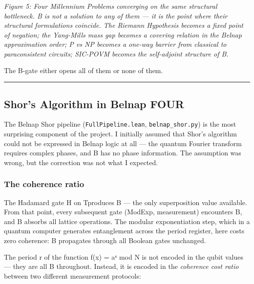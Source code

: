 \documentclass[12pt,a4paper]{article}
\begin{document}
\emph{Figure 5: Four Millennium Problems converging on the same structural bottleneck. B is not a solution to any of them --- it is the point where their structural formulations coincide. The Riemann Hypothesis becomes a fixed point of negation; the Yang-Mills mass gap becomes a covering relation in the Belnap approximation order; P vs NP becomes a one-way barrier from classical to paraconsistent circuits; SIC-POVM becomes the self-adjoint structure of B.}

The B-gate either opens all of them or none of them.

\begin{center}
\rule{0.5\textwidth}{0.4pt}
\end{center}

\subsection{Shor's Algorithm in Belnap FOUR}

The Belnap Shor pipeline (\texttt{FullPipeline.lean}, \texttt{belnap\_shor.py}) is the most surprising component of the project. I initially assumed that Shor's algorithm could not be expressed in Belnap logic at all --- the quantum Fourier transform requires complex phases, and B has no phase information. The assumption was wrong, but the correction was not what I expected.

\subsubsection{The coherence ratio}

The Hadamard gate H on \textbar{}T\rangle produces B --- the only superposition value available. From that point, every subsequent gate (ModExp, measurement) encounters B, and B absorbs all lattice operations. The modular exponentiation step, which in a quantum computer generates entanglement across the period register, here costs zero coherence: B propagates through all Boolean gates unchanged.

The period r of the function f(x) = aˣ mod N is not encoded in the qubit values --- they are all B throughout. Instead, it is encoded in the \emph{coherence cost ratio} between two different measurement protocols:
\end{document}

